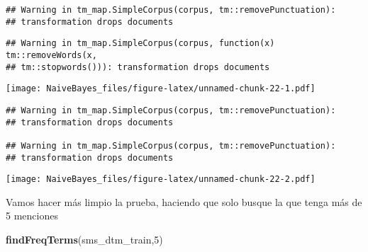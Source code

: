 \documentclass[]{article}
\newenvironment{Shaded}{\begin{snugshade}}{\end{snugshade}}
\newcommand{\KeywordTok}[1]{\textcolor[rgb]{0.13,0.29,0.53}{\textbf{#1}}}
\newcommand{\DataTypeTok}[1]{\textcolor[rgb]{0.13,0.29,0.53}{#1}}
\newcommand{\DecValTok}[1]{\textcolor[rgb]{0.00,0.00,0.81}{#1}}
\newcommand{\FloatTok}[1]{\textcolor[rgb]{0.00,0.00,0.81}{#1}}
\newcommand{\OperatorTok}[1]{\textcolor[rgb]{0.81,0.36,0.00}{\textbf{#1}}}
\newcommand{\NormalTok}[1]{#1}
\begin{document}
\begin{verbatim}
## Warning in tm_map.SimpleCorpus(corpus, tm::removePunctuation):
## transformation drops documents
\end{verbatim}

\begin{verbatim}
## Warning in tm_map.SimpleCorpus(corpus, function(x) tm::removeWords(x,
## tm::stopwords())): transformation drops documents
\end{verbatim}

\texttt{[image: NaiveBayes\_files/figure-latex/unnamed-chunk-22-1.pdf]}

\begin{Shaded}
\end{Shaded}

\begin{verbatim}
## Warning in tm_map.SimpleCorpus(corpus, tm::removePunctuation):
## transformation drops documents

## Warning in tm_map.SimpleCorpus(corpus, tm::removePunctuation):
## transformation drops documents
\end{verbatim}

\texttt{[image: NaiveBayes\_files/figure-latex/unnamed-chunk-22-2.pdf]}

Vamos hacer más limpio la prueba, haciendo que solo busque la que tenga
más de 5 menciones

\begin{Shaded}
\begin{Highlighting}[]
\KeywordTok{findFreqTerms}\NormalTok{(sms_dtm_train,}\DecValTok{5}\NormalTok{)}
\end{Highlighting}
\end{Shaded}
\end{document}
